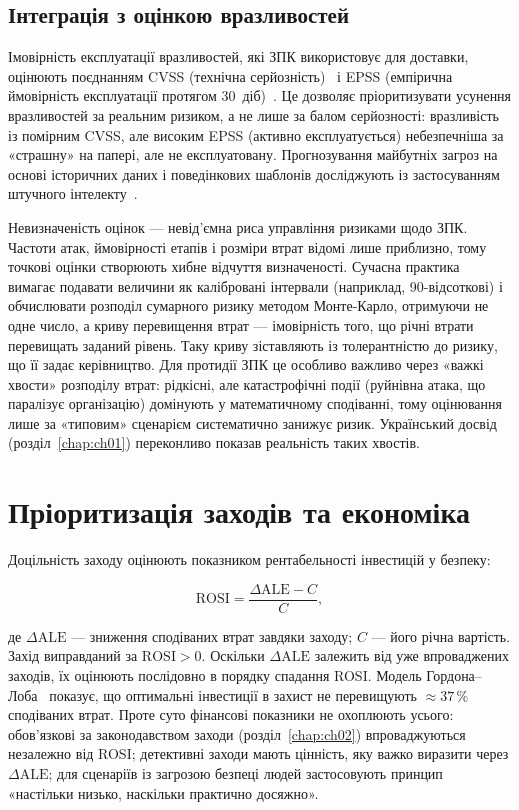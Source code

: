 \subsection{Інтеграція з оцінкою вразливостей}

Імовірність експлуатації вразливостей, які ЗПК використовує для доставки, оцінюють поєднанням CVSS (технічна серйозність)~\cite{ch02:cvss} і EPSS (емпірична ймовірність експлуатації протягом 30~діб)~\cite{ch04:epss}. Це дозволяє пріоритизувати усунення вразливостей за реальним ризиком, а не лише за балом серйозності: вразливість із помірним CVSS, але високим EPSS (активно експлуатується) небезпечніша за «страшну» на папері, але не експлуатовану. Прогнозування майбутніх загроз на основі історичних даних і поведінкових шаблонів досліджують із застосуванням штучного інтелекту~\cite{ch04:ilienko}.

Невизначеність оцінок --- невід'ємна риса управління ризиками щодо ЗПК. Частоти атак, ймовірності етапів і розміри втрат відомі лише приблизно, тому точкові оцінки створюють хибне відчуття визначеності. Сучасна практика~\cite{ch04:fair} вимагає подавати величини як калібровані інтервали (наприклад, 90-відсоткові) і обчислювати розподіл сумарного ризику методом Монте-Карло, отримуючи не одне число, а криву перевищення втрат --- імовірність того, що річні втрати перевищать заданий рівень. Таку криву зіставляють із толерантністю до ризику, що її задає керівництво. Для протидії ЗПК це особливо важливо через «важкі хвости» розподілу втрат: рідкісні, але катастрофічні події (руйнівна атака, що паралізує організацію) домінують у математичному сподіванні, тому оцінювання лише за «типовим» сценарієм систематично занижує ризик. Український досвід (розділ~\ref{chap:ch01}) переконливо показав реальність таких хвостів.

\section{Пріоритизація заходів та економіка}\label{sec:ch04-economics}

Доцільність заходу оцінюють показником рентабельності інвестицій у безпеку:

\begin{equation}
\mathrm{ROSI} = \frac{\Delta\mathrm{ALE} - C}{C},
\label{eq:ch04-rosi}
\end{equation}

де $\Delta\mathrm{ALE}$ --- зниження сподіваних втрат завдяки заходу; $C$ --- його річна вартість. Захід виправданий за $\mathrm{ROSI}>0$. Оскільки $\Delta\mathrm{ALE}$ залежить від уже впроваджених заходів, їх оцінюють послідовно в порядку спадання ROSI. Модель Гордона--Лоба~\cite{ch04:gordonloeb} показує, що оптимальні інвестиції в захист не перевищують $\approx 37\,\%$ сподіваних втрат. Проте суто фінансові показники не охоплюють усього: обов'язкові за законодавством заходи (розділ~\ref{chap:ch02}) впроваджуються незалежно від ROSI; детективні заходи мають цінність, яку важко виразити через $\Delta\mathrm{ALE}$; для сценаріїв із загрозою безпеці людей застосовують принцип «настільки низько, наскільки практично досяжно».

